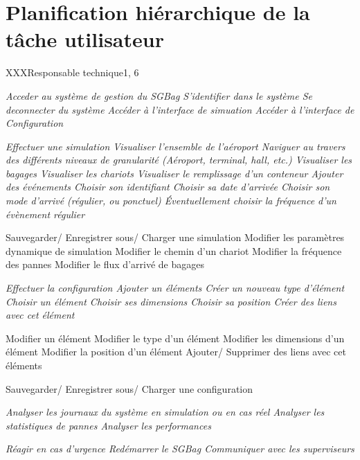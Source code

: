 \newpage
\part{Planification hiérarchique de la tâche utilisateur}

\phtu
{XXX}{Responsable technique}{1, 6}
{
\begin{tabular}
	\it{} Acceder au système de gestion du SGBag
		\sit{} S'identifier dans le système
		\sit{} Se deconnecter du système
		\sit{} Accéder à l'interface de simuation
		\sit{} Accéder à l'interface de Configuration

	\it{} Effectuer une simulation
		\sit{} Visualiser l'ensemble de l'aéroport
			\ssit{} Naviguer au travers des différents niveaux de granularité (Aéroport, terminal, hall, \textsl{etc.})
			\ssit{} Visualiser les bagages
			\ssit{} Visualiser les chariots
			\ssit{} Visualiser le remplissage d'un conteneur
		\sit{} Ajouter des événements
			\ssit{} Choisir son identifiant
			\ssit{} Choisir sa date d'arrivée
			\ssit{} Choisir son mode d'arrivé (régulier, ou ponctuel)
			\ssit{} Éventuellement choisir la fréquence d'un évènement régulier

		\sit{} Sauvegarder/ Enregistrer sous/ Charger une simulation
		\sit{} Modifier les paramètres dynamique de simulation
			\ssit{} Modifier le chemin d'un chariot	
			\ssit{} Modifier la fréquence des pannes
			\ssit{} Modifier le flux d'arrivé de bagages
	
	\it{} Effectuer la configuration
		\sit{} Ajouter un éléments 
			\ssit{} Créer un nouveau type d'élément
			\ssit{} Choisir un élément
			\ssit{} Choisir ses dimensions
			\ssit{} Choisir sa position
			\ssit{} Créer des liens avec cet élément

		\sit{} Modifier un élément
			\ssit{} Modifier le type d'un élément
			\ssit{} Modifier les dimensions d'un élément
			\ssit{} Modifier la position d'un élément
			\ssit{} Ajouter/ Supprimer des liens avec cet éléments
		
		\sit{} Sauvegarder/ Enregistrer sous/ Charger une configuration

	\it{} Analyser les journaux du système en simulation ou en cas réel
		\sit{} Analyser les statistiques de pannes
		\sit{} Analyser les performances

	\it{} Réagir en cas d'urgence 
		\sit{} Redémarrer le SGBag
		\sit{} Communiquer avec les superviseurs

\end{tabular}
}

